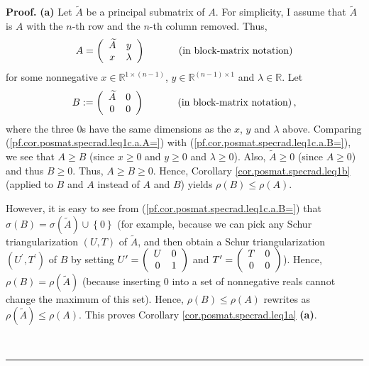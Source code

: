 \documentclass[numbers=enddot,12pt,final,onecolumn,notitlepage]{scrartcl}%
\numberwithin{exer}{subsection}
\theoremstyle{definition}
\newenvironment{proof}[1][Proof]{\noindent\textbf{#1.} }{\ \rule{0.5em}{0.5em}}
\begin{document}
\begin{proof}
\textbf{(a)} Let $\widetilde{A}$ be a principal submatrix of $A$. For
simplicity, I assume that $\widetilde{A}$ is $A$ with the $n$-th row and the
$n$-th column removed. Thus,%
\begin{equation}
A=\left(
\begin{array}
[c]{cc}%
\widetilde{A} & y\\
x & \lambda
\end{array}
\right)  \ \ \ \ \ \ \ \ \ \ \left(  \text{in block-matrix notation}\right)
\label{pf.cor.posmat.specrad.leq1c.a.A=}%
\end{equation}
for some nonnegative $x\in\mathbb{R}^{1\times\left(  n-1\right)  }$,
$y\in\mathbb{R}^{\left(  n-1\right)  \times1}$ and $\lambda\in\mathbb{R}$.
Let
\begin{equation}
B:=\left(
\begin{array}
[c]{cc}%
\widetilde{A} & 0\\
0 & 0
\end{array}
\right)  \ \ \ \ \ \ \ \ \ \ \left(  \text{in block-matrix notation}\right)
,\label{pf.cor.posmat.specrad.leq1c.a.B=}%
\end{equation}
where the three $0$s have the same dimensions as the $x$, $y$ and $\lambda$
above. Comparing (\ref{pf.cor.posmat.specrad.leq1c.a.A=}) with
(\ref{pf.cor.posmat.specrad.leq1c.a.B=}), we see that $A\geq B$ (since
$x\geq0$ and $y\geq0$ and $\lambda\geq0$). Also, $\widetilde{A}\geq0$ (since
$A\geq0$) and thus $B\geq0$. Thus, $A\geq B\geq0$. Hence, Corollary
\ref{cor.posmat.specrad.leq1b} (applied to $B$ and $A$ instead of $A$ and $B$)
yields $\rho\left(  B\right)  \leq\rho\left(  A\right)  $.

However, it is easy to see from (\ref{pf.cor.posmat.specrad.leq1c.a.B=}) that
$\sigma\left(  B\right)  =\sigma\left(  \widetilde{A}\right)  \cup\left\{
0\right\}  $ (for example, because we can pick any Schur triangularization
$\left(  U,T\right)  $ of $\widetilde{A}$, and then obtain a Schur
triangularization $\left(  U^{\prime},T^{\prime}\right)  $ of $B$ by setting
$U^{\prime}=\left(
\begin{array}
[c]{cc}%
U & 0\\
0 & 1
\end{array}
\right)  $ and $T^{\prime}=\left(
\begin{array}
[c]{cc}%
T & 0\\
0 & 0
\end{array}
\right)  $). Hence, $\rho\left(  B\right)  =\rho\left(  \widetilde{A}\right)
$ (because inserting $0$ into a set of nonnegative reals cannot change the
maximum of this set). Hence,  $\rho\left(  B\right)  \leq\rho\left(  A\right)
$ rewrites as  $\rho\left(  \widetilde{A}\right)  \leq\rho\left(  A\right)  $.
This proves Corollary \ref{cor.posmat.specrad.leq1a} \textbf{(a)}. \medskip


\end{proof}
\end{document}
